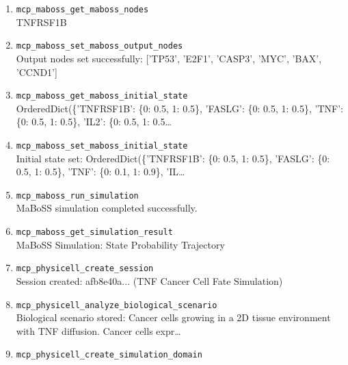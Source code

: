 \begin{enumerate}
\hfill\\
\RaggedRight MaBoSS simulation loaded successfully.
\item[10.] \texttt{mcp\_\allowbreak{}maboss\_\allowbreak{}get\_\allowbreak{}maboss\_\allowbreak{}nodes}
\hfill\\
\RaggedRight TNFRSF1B
\item[11.] \texttt{mcp\_\allowbreak{}maboss\_\allowbreak{}set\_\allowbreak{}maboss\_\allowbreak{}output\_\allowbreak{}nodes}
\hfill\\
\RaggedRight Output nodes set successfully: ['TP53', 'E2F1', 'CASP3', 'MYC', 'BAX', 'CCND1']
\item[12.] \texttt{mcp\_\allowbreak{}maboss\_\allowbreak{}get\_\allowbreak{}maboss\_\allowbreak{}initial\_\allowbreak{}state}
\hfill\\
\RaggedRight OrderedDict(\{'TNFRSF1B': \{0: 0.5, 1: 0.5\}, 'FASLG': \{0: 0.5, 1: 0.5\}, 'TNF': \{0: 0.5, 1: 0.5\}, 'IL2': \{0: 0.5, 1: 0.5\ldots{}
\item[13.] \texttt{mcp\_\allowbreak{}maboss\_\allowbreak{}set\_\allowbreak{}maboss\_\allowbreak{}initial\_\allowbreak{}state}
\hfill\\
\RaggedRight Initial state set: OrderedDict(\{'TNFRSF1B': \{0: 0.5, 1: 0.5\}, 'FASLG': \{0: 0.5, 1: 0.5\}, 'TNF': \{0: 0.1, 1: 0.9\}, 'IL\ldots{}
\item[14.] \texttt{mcp\_\allowbreak{}maboss\_\allowbreak{}run\_\allowbreak{}simulation}
\hfill\\
\RaggedRight MaBoSS simulation completed successfully.
\item[15.] \texttt{mcp\_\allowbreak{}maboss\_\allowbreak{}get\_\allowbreak{}simulation\_\allowbreak{}result}
\hfill\\
\RaggedRight MaBoSS Simulation: State Probability Trajectory
\item[16.] \texttt{mcp\_\allowbreak{}physicell\_\allowbreak{}create\_\allowbreak{}session}
\hfill\\
\RaggedRight Session created: afb8e40a... (TNF Cancer Cell Fate Simulation)
\item[17.] \texttt{mcp\_\allowbreak{}physicell\_\allowbreak{}analyze\_\allowbreak{}biological\_\allowbreak{}scenario}
\hfill\\
\RaggedRight Biological scenario stored: Cancer cells growing in a 2D tissue environment with TNF diffusion. Cancer cells expr\ldots{}
\item[18.] \texttt{mcp\_\allowbreak{}physicell\_\allowbreak{}create\_\allowbreak{}simulation\_\allowbreak{}domain}
\hfill\\

\end{enumerate}
